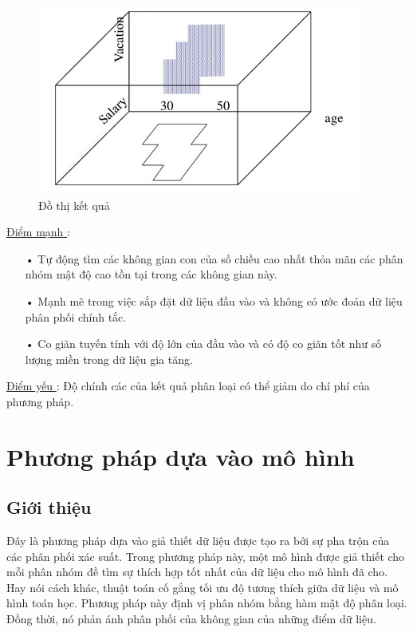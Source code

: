 \begin{figure}[htp]
\centering
\includegraphics{Images/Clique_03}
\caption{Đồ thị kết quả}
\label{fig:Clique_03}
\end{figure}

\underline{Điểm mạnh }:
\begin{enumerate}
\item[•]Tự động tìm các không gian con của số chiều cao nhất thỏa mãn các phân nhóm mật độ cao tồn tại trong các không gian này.
\item[•]Mạnh mẽ trong việc sắp đặt dữ liệu đầu vào và không có ước đoán dữ liệu phân phối chính tắc.
\item[•]Co giãn tuyến tính với độ lớn của đầu vào và có độ co giãn tốt như số lượng miền trong dữ liệu gia tăng.
\end{enumerate}

\underline{Điểm yếu }: Độ chính các của kết quả phân loại có thể giảm do chí phí của phương pháp.
\section{Phương pháp dựa vào mô hình}
\subsection{Giới thiệu}
\hspace{10mm} Đây là phương pháp dựa vào giả thiết dữ liệu được tạo ra bởi sự pha trộn của các phân phối xác suất. Trong phương pháp này, một mô hình được giả thiết cho mỗi phân nhóm đề tìm sự thích hợp tốt nhất của dữ liệu cho mô hình đã cho. Hay nói cách khác, thuật toán cố gắng tối ưu độ tương thích giữa dữ liệu và mô hình toán học. Phương pháp này định vị phân nhóm bằng hàm mật độ phân loại. Đồng thời, nó phản ánh phân phối của không gian của những điểm dữ liệu.

